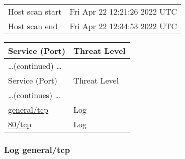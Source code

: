 \documentclass{article}
\begin{document}
\begin{tabular}{ll}
Host scan start&Fri Apr 22 12:21:26 2022 UTC\\
Host scan end&Fri Apr 22 12:34:53 2022 UTC\\
\end{tabular}

\begin{longtable}{|l|l|}
\hline
\rowcolor{gvm_report}Service (Port)&Threat Level\\
\hline
\endfirsthead
\multicolumn{2}{l}{\hfill\ldots (continued) \ldots}\\
\hline
\rowcolor{gvm_report}Service (Port)&Threat Level\\
\hline
\endhead
\hline
\multicolumn{2}{l}{\ldots (continues) \ldots}\\
\endfoot
\hline
\endlastfoot
\hline
\hyperref[port:192.168.178.29 general/tcp Log]{general/tcp}&Log\\
\hline
\hyperref[port:192.168.178.29 80/tcp Log]{80/tcp}&Log\\
\hline
\end{longtable}



\subsubsection{Log general/tcp}
\label{port:192.168.178.29 general/tcp Log}
\end{document}
